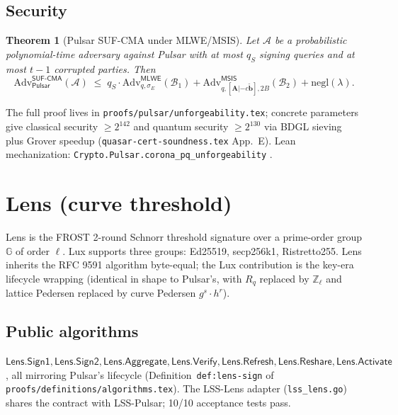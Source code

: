 \documentclass[11pt,a4paper]{article}
\newtheorem{theorem}{Theorem}
\begin{document}
\subsection{Security}

\begin{theorem}[Pulsar SUF-CMA under MLWE/MSIS]
\label{thm:pulsar-suf-cma-spec}
Let $\mathcal{A}$ be a probabilistic polynomial-time adversary against Pulsar with at most $q_S$ signing queries and at most $t-1$ corrupted parties. Then
\[
  \mathrm{Adv}^{\mathsf{SUF\text{-}CMA}}_{\mathsf{Pulsar}}(\mathcal{A})
  \;\leq\; q_S \cdot \mathrm{Adv}^{\mathsf{MLWE}}_{q, \sigma_E}(\mathcal{B}_1)
  + \mathrm{Adv}^{\mathsf{MSIS}}_{q, [\mathbf{A}|-c\tilde{\mathbf{b}}], 2B}(\mathcal{B}_2)
  + \mathrm{negl}(\lambda).
\]
\end{theorem}

The full proof lives in \texttt{proofs/pulsar/unforgeability.tex}; concrete parameters give classical security $\geq 2^{142}$ and quantum security $\geq 2^{130}$ via BDGL sieving plus Grover speedup (\texttt{quasar-cert-soundness.tex} App.~E). Lean mechanization: \texttt{Crypto.Pulsar.corona\_pq\_unforgeability} \cite{leancrypto}.

\section{Lens (curve threshold)}
\label{sec:spec-lens}

Lens is the FROST 2-round Schnorr threshold signature \cite{rfc9591} over a prime-order group $\mathbb{G}$ of order $\ell$. Lux supports three groups: Ed25519, secp256k1, Ristretto255. Lens inherits the RFC 9591 algorithm byte-equal; the Lux contribution is the key-era lifecycle wrapping (identical in shape to Pulsar's, with $R_q$ replaced by $\mathbb{Z}_\ell$ and lattice Pedersen replaced by curve Pedersen $g^s \cdot h^r$).

\subsection{Public algorithms}

$\mathsf{Lens.Sign1}, \mathsf{Lens.Sign2}, \mathsf{Lens.Aggregate}, \mathsf{Lens.Verify}, \mathsf{Lens.Refresh}, \mathsf{Lens.Reshare}, \mathsf{Lens.Activate}$, all mirroring Pulsar's lifecycle (Definition~\texttt{def:lens-sign} of \texttt{proofs/definitions/algorithms.tex}). The LSS-Lens adapter (\texttt{lss\_lens.go}) shares the contract with LSS-Pulsar; 10/10 acceptance tests pass.
\end{document}
